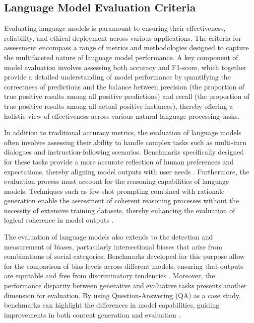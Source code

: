 \subsection{Language Model Evaluation Criteria} \label{subsec:Language Model Evaluation Criteria}



Evaluating language models is paramount to ensuring their effectiveness, reliability, and ethical deployment across various applications. The criteria for assessment encompass a range of metrics and methodologies designed to capture the multifaceted nature of language model performance. A key component of model evaluation involves assessing both accuracy and F1-score, which together provide a detailed understanding of model performance by quantifying the correctness of predictions and the balance between precision (the proportion of true positive results among all positive predictions) and recall (the proportion of true positive results among all actual positive instances), thereby offering a holistic view of effectiveness across various natural language processing tasks. \cite{shi2019newevaluationframeworktopic,nimase2024morecontextshelpsarcasm}

In addition to traditional accuracy metrics, the evaluation of language models often involves assessing their ability to handle complex tasks such as multi-turn dialogues and instruction-following scenarios. Benchmarks specifically designed for these tasks provide a more accurate reflection of human preferences and expectations, thereby aligning model outputs with user needs \cite{JudgingLLM1}. Furthermore, the evaluation process must account for the reasoning capabilities of language models. Techniques such as few-shot prompting combined with rationale generation enable the assessment of coherent reasoning processes without the necessity of extensive training datasets, thereby enhancing the evaluation of logical coherence in model outputs \cite{wei2022chain}.

The evaluation of language models also extends to the detection and measurement of biases, particularly intersectional biases that arise from combinations of social categories. Benchmarks developed for this purpose allow for the comparison of bias levels across different models, ensuring that outputs are equitable and free from discriminatory tendencies \cite{magee2021intersectionalbiascausallanguage}. Moreover, the performance disparity between generative and evaluative tasks presents another dimension for evaluation. By using Question-Answering (QA) as a case study, benchmarks can highlight the differences in model capabilities, guiding improvements in both content generation and evaluation \cite{oh2024generativeaiparadoxevaluation}.

